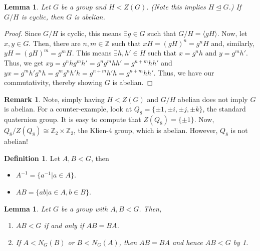 \documentclass[11pt,leqno,oneside]{amsart}
\newcommand{\Z}{{\mathbb Z}} %
\newcommand{\subgroup}{\mathrel{<}}
\newcommand{\normsubgroup}{\mathrel{\unlhd}}
\newcommand{\isom}{\mathrel{\cong}}
\newtheorem{lem}[thm]{Lemma}
\theoremstyle{definition}
\newtheorem{defn}[thm]{Definition}
\newtheorem*{rmk*}{Remark}
\numberwithin{equation}{section}
\begin{document}
    \begin{lem}
        Let $G$ be a group and $H \subgroup Z(G)$. (Note this implies $H
        \normsubgroup G$.) If $G/H$ is cyclic, then $G$ is abelian.
    \end{lem}
    \begin{proof}
        Since $G/H$ is cyclic, this means $\exists g \in G$ such that
        $G/H=\langle gH \rangle$. Now, let $x,y \in G$. Then, there are $n,m
        \in \Z$ such that $xH = (gH)^n = g^nH$ and, similarly, $yH = (gH)^m =
        g^mH$. This means $\exists h,h' \in H$ such that $x=g^nh$ and
        $y=g^mh'$. Thus, we get $xy = g^nhg^mh' = g^ng^mhh' = g^{n+m}hh'$ and
        $yx = g^mh'g^nh = g^mg^nh'h = g^{n+m}h'h = g^{n+m}hh'$. Thus, we have
        our commutativity, thereby showing $G$ is abelian.
    \end{proof}
    \begin{rmk*}
        Note, simply having $H \subgroup Z(G)$ and $G/H$ abelian does not imply
        $G$ is abelian. For a counter-example, look at $Q_8 = \{\pm 1, \pm i,
        \pm j, \pm k\}$, the standard quaternion group. It is easy to compute
        that $Z(Q_8) = \{\pm 1\}$. Now, $Q_8/Z(Q_8) \isom \Z_2 \times \Z_2$,
        the Klien-4 group, which is abelian. However, $Q_8$ is not abelian!
    \end{rmk*}
    \begin{defn}
        Let $A,B \subgroup G$, then \begin{itemize}
            \item $A^{-1} = \{a^{-1} | a \in A\}$.
            \item $AB = \{ab | a \in A, b \in B\}$.
        \end{itemize}
    \end{defn}
    \begin{lem}
        Let $G$ be a group with $A,B \subgroup G$. Then,
        \begin{enumerate}
            \item $AB \subgroup G$ if and only if $AB = BA$.
            \item If $A \subgroup N_G(B)$ or $B \subgroup N_G(A)$, then $AB =
                BA$ and hence $AB \subgroup G$ by 1.
        \end{enumerate}
    \end{lem}
\end{document}
